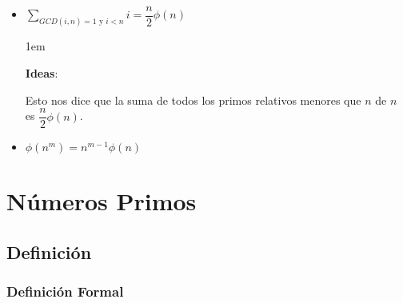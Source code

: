 \documentclass[12pt, fleqn]{report}                             %
\newenvironment{SmallIndentation}[1][0.75em]                    %
    {\begin{adjustwidth}{#1}{}\begin{footnotesize}}                 %
    {\end{footnotesize}\end{adjustwidth}}                           %
\begin{document}
\begin{itemize}
\begin{SmallIndentation}[1em]
                    \end{SmallIndentation}




                \item $\sum\limits_{GCD(i, n) = 1 \text{ y } i < n} i = \dfrac{n}{2} \phi(n)$
                    \begin{SmallIndentation}[1em]
                        \textbf{Ideas}:

                        Esto nos dice que la suma de todos los primos relativos menores que
                        $n$ de $n$ es $\dfrac{n}{2} \phi(n)$.

                    \end{SmallIndentation}

                \item $\phi(n^m) = n^{m-1} \phi(n)$

                \clearpage

                

            \end{itemize}






\chapter{Números Primos}
    \clearpage

     

    \clearpage
    \section{Definición}

        \subsection*{Definición Formal}
\end{document}
